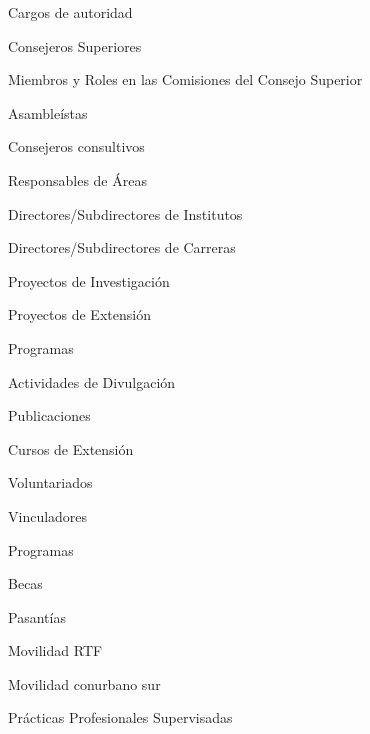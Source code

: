\item Cargos de autoridad
\item Consejeros Superiores
\item Miembros y Roles en las Comisiones del Consejo Superior
\item Asambleístas
\item Consejeros consultivos
\item Responsables de Áreas
\item Directores/Subdirectores de Institutos
\item Directores/Subdirectores de Carreras
\item Proyectos de Investigación
\item Proyectos de Extensión
\item Programas
\item Actividades de Divulgación
\item Publicaciones
\item Cursos de Extensión
\item Voluntariados
\item Vinculadores
\item Programas
\item Becas
\item Pasantías
\item Movilidad RTF
\item Movilidad conurbano sur
\item Prácticas Profesionales Supervisadas
